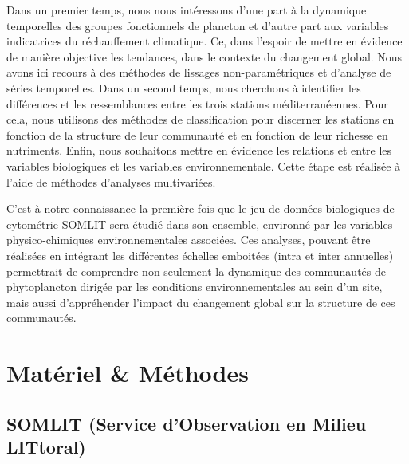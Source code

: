 \documentclass[12pt]{article}
\begin{document}
Dans un premier temps, nous nous intéressons d’une part à la dynamique temporelles des groupes fonctionnels de plancton et d’autre part aux variables indicatrices du réchauffement climatique. Ce, dans l’espoir de mettre en évidence de manière objective les tendances, dans le contexte du changement global. Nous avons ici recours à des méthodes de lissages non-paramétriques et d’analyse de séries temporelles. Dans un second temps, nous cherchons à identifier les différences et les ressemblances entre les trois stations méditerranéennes. Pour cela, nous utilisons des méthodes de classification pour discerner les stations en fonction de la structure de leur communauté et en fonction de leur richesse en nutriments. Enfin, nous souhaitons mettre en évidence les relations et entre les variables biologiques et les variables environnementale. Cette étape est réalisée à l’aide de méthodes d’analyses multivariées. 

C’est à notre connaissance la première fois que le jeu de données biologiques de cytométrie SOMLIT sera étudié dans son ensemble, environné par les variables physico-chimiques environnementales associées. Ces analyses, pouvant être réalisées en intégrant les différentes échelles emboitées (intra et inter annuelles) \citep{Nerini2021} permettrait de comprendre non seulement la dynamique des communautés de phytoplancton dirigée par les conditions environnementales au sein d’un site, mais aussi d’appréhender l’impact du changement global sur la structure de ces communautés.


\section{Matériel \& Méthodes}

\subsection{SOMLIT (Service d'Observation en Milieu LITtoral)}

\end{document}
